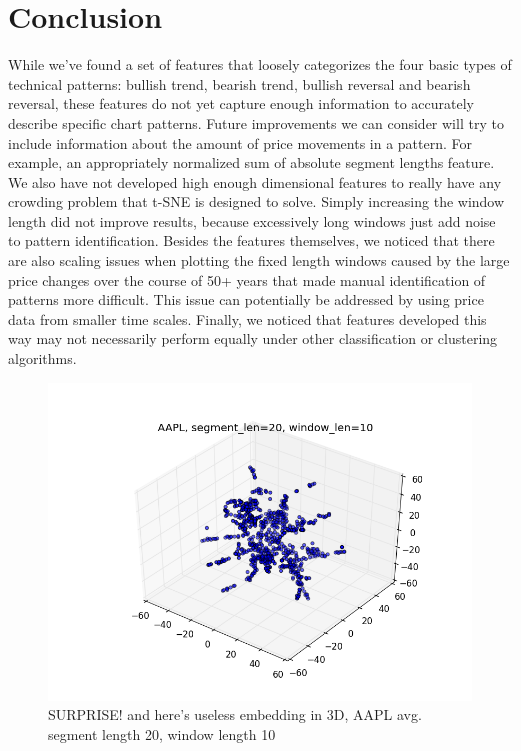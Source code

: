 \documentclass{article} %
\begin{document}
\section{Conclusion}
While we've found a set of features that loosely categorizes the four basic types of technical patterns: bullish trend, bearish trend, bullish reversal and bearish reversal, these features do not yet capture enough information to accurately describe specific chart patterns. Future improvements we can consider will try to include information about the amount of price movements in a pattern. For example, an appropriately normalized sum of absolute segment lengths feature. We also have not developed high enough dimensional features to really have any crowding problem \cite{Hinton08tsne} that t-SNE is designed to solve. Simply increasing the window length did not improve results, because excessively long windows just add noise to pattern identification. Besides the features themselves, we noticed that there are also scaling issues when plotting the fixed length windows caused by the large price changes over the course of 50+ years that made manual identification of patterns more difficult. This issue can potentially be addressed by using price data from smaller time scales. Finally, we noticed that features developed this way may not necessarily perform equally under other classification or clustering algorithms.
\begin{figure}[h]
\begin{center}
\includegraphics[width=1\textwidth]{aapl-3d-2.png}
\end{center}
\caption{SURPRISE! and here's useless embedding in 3D, AAPL avg. segment length 20, window length 10}
\end{figure}



\end{document}

